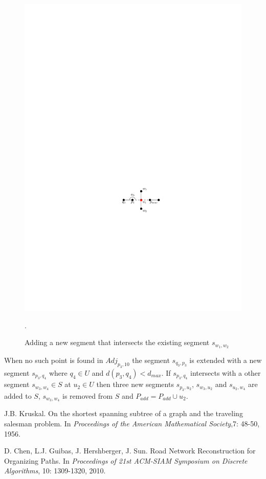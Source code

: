 \documentclass[11pt]{article}
\begin{document}
\begin{figure}[h]
\centering
      \graphicspath{ {images/}}
      \includegraphics[width=0.9\linewidth]{NetworkAddIntersection}
      \label{fig:AddIntersect}
      \caption{Adding a new segment that intersects the existing segment $s_{w_1,w_2}$}.
  \end{figure}

When no such point is found in $Adj_{p_3,10}$ the segment $s_{q_3, p_3}$ is extended with a new segment $s_{p_3,q_4}$ where $q_4 \in U$ and $d(p_3,q_4)<d_{max}$. If $s_{p_3,q_4}$ intersects with a other segment $s_{w_3,w_4} \in S$ at $u_2 \in U$ then three new segments $s_{p_3,u_2}$, $s_{w_3,u_2}$ and $s_{u_2,w_4}$ are added to $S$, $s_{w_3,w_4}$ is removed from $S$ and $P_{add}=P_{add}\cup u_2$.






\begin{thebibliography}{}

J.B. Kruskal.
On the shortest spanning subtree of a graph and the traveling salesman problem.
In \emph{Proceedings of the American Mathematical Society},7: 48-50, 1956.

D. Chen, L.J. Guibas, J. Hershberger, J. Sun.
Road Network Reconstruction for Organizing Paths.
In \emph{Proceedings  of  21st  ACM-SIAM  Symposium  on  Discrete  Algorithms}, 10: 1309-1320, 2010.
\end{thebibliography}
\end{document}
